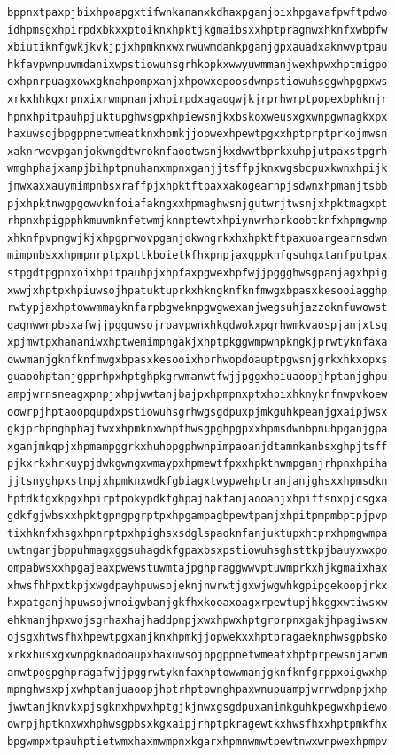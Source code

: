 \documentclass[11pt,letterpaper]{exam}
\begin{document}
\begin{questions}
\begin{verbatim}
bppnxtpaxpjbixhpoapgxtifwnkananxkdhaxpganjbixhpgavafpwftpdwo
idhpmsgxhpirpdxbkxxptoiknxhpktjkgmaibsxxhptpragnwxhknfxwbpfw
xbiutiknfgwkjkvkjpjxhpmknxwxrwuwmdankpganjgpxauadxaknwvptpau
hkfavpwnpuwmdanixwpstiowuhsgrhkopkxwwyuwmmanjwexhpwxhptmigpo
exhpnrpuagxowxgknahpompxanjxhpowxepoosdwnpstiowuhsggwhpgpxws
xrkxhhkgxrpnxixrwmpnanjxhpirpdxagaogwjkjrprhwrptpopexbphknjr
hpnxhpitpauhpjuktupghwsgpxhpiewsnjkxbskoxweusxgxwnpgwnagkxpx
haxuwsojbpgppnetwmeatknxhpmkjjopwexhpewtpgxxhptprptprkojmwsn
xaknrwovpganjokwngdtwroknfaootwsnjkxdwwtbprkxuhpjutpaxstpgrh
wmghphajxampjbihptpnuhanxmpnxganjjtsffpjknxwgsbcpuxkwnxhpijk
jnwxaxxauymimpnbsxraffpjxhpktftpaxxakogearnpjsdwnxhpmanjtsbb
pjxhpktnwgpgowvknfoiafakngxxhpmaghwsnjgutwrjtwsnjxhpktmagxpt
rhpnxhpigpphkmuwmknfetwmjknnptewtxhpiynwrhprkoobtknfxhpmgwmp
xhknfpvpngwjkjxhpgprwovpganjokwngrkxhxhpktftpaxuoargearnsdwn
mimpnbsxxhpmpnrptpxpttkboietkfhxpnpjaxgppknfgsuhgxtanfputpax
stpgdtpgpnxoixhpitpauhpjxhpfaxpgwexhpfwjjpggghwsgpanjagxhpig
xwwjxhptpxhpiuwsojhpatuktuprkxhkngknfknfmwgxbpasxkesooiagghp
rwtypjaxhptowwmmayknfarpbgweknpgwgwexanjwegsuhjazzoknfuwowst
gagnwwnpbsxafwjjpgguwsojrpavpwnxhkgdwokxpgrhwmkvaospjanjxtsg
xpjmwtpxhananiwxhptwemimpngakjxhptpkggwmpwnpkngkjprwtyknfaxa
owwmanjgknfknfmwgxbpasxkesooixhprhwopdoauptpgwsnjgrkxhkxopxs
guaoohptanjgpprhpxhptghpkgrwmanwtfwjjpggxhpiuaoopjhptanjghpu
ampjwrnsneagxpnpjxhpjwwtanjbajpxhpmpnxptxhpixhknyknfnwpvkoew
oowrpjhptaoopqupdxpstiowuhsgrhwgsgdpuxpjmkguhkpeanjgxaipjwsx
gkjprhpnghphajfwxxhpmknxwhpthwsgpghpgpxxhpmsdwnbpnuhpganjgpa
xganjmkqpjxhpmampggrkxhuhppgphwnpimpaoanjdtamnkanbsxghpjtsff
pjkxrkxhrkuypjdwkgwngxwmaypxhpmewtfpxxhpkthwmpganjrhpnxhpiha
jjtsnyghpxstnpjxhpmknxwdkfgbiagxtwypwehptranjanjghsxxhpmsdkn
hptdkfgxkpgxhpirptpokypdkfghpajhaktanjaooanjxhpiftsnxpjcsgxa
gdkfgjwbsxxhpktgpngpgrptpxhpgampagbpewtpanjxhpitpmpmbptpjpvp
tixhknfxhsgxhpnrptpxhpighsxsdglspaoknfanjuktupxhtprxhpmgwmpa
uwtnganjbppuhmagxggsuhagdkfgpaxbsxpstiowuhsghsttkpjbauyxwxpo
ompabwsxxhpgajeaxpwewstuwmtajpghpraggwwvptuwmprkxhjkgmaixhax
xhwsfhhpxtkpjxwgdpayhpuwsojeknjnwrwtjgxwjwgwhkgpipgekoopjrkx
hxpatganjhpuwsojwnoigwbanjgkfhxkooaxoagxrpewtupjhkggxwtiwsxw
ehkmanjhpxwojsgrhaxhajhaddpnpjxwxhpwxhptgrprpnxgakjhpagiwsxw
ojsgxhtwsfhxhpewtpgxanjknxhpmkjjopwekxxhptpragaeknphwsgpbsko
xrkxhusxgxwnpgknadoaupxhaxuwsojbpgppnetwmeatxhptprpewsnjarwm
anwtpogpghpragafwjjpggrwtyknfaxhptowwmanjgknfknfgrppxoigwxhp
mpnghwsxpjxwhptanjuaoopjhptrhptpwnghpaxwnupuampjwrnwdpnpjxhp
jwwtanjknvkxpjsgknxhpwxhptgjkjnwxgsgdpuxanimkguhkpegwxhpiewo
owrpjhptknxwxhphwsgpbsxkgxaipjrhptpkragewtkxhwsfhxxhptpmkfhx
bpgwmpxtpauhptietwmxhaxmwmpnxkgarxhpmnwmwtpewtnwxwnpwexhpmpv

\end{verbatim}
\end{questions}
\end{document}

